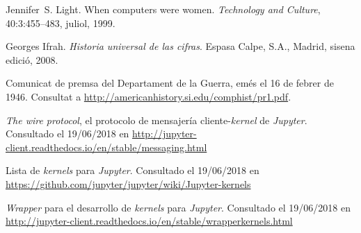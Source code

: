 \documentclass[11pt,spanish,listoffigures,listoftables]{tfgetsinf}
\begin{document}


\printglossary[title=Glosario]





\begin{thebibliography}{10}
   Jennifer~S. Light.
   \newblock When computers were women.
   \newblock \textit{Technology and Culture}, 40:3:455--483, juliol, 1999.

   Georges Ifrah.
   \newblock \textit{Historia universal de las cifras}.
   \newblock Espasa Calpe, S.A., Madrid, sisena edició, 2008.

   Comunicat de premsa del Departament de la Guerra, 
   emés el 16 de febrer de 1946. 
   \newblock Consultat a 
   \url{http://americanhistory.si.edu/comphist/pr1.pdf}.

	\textit{The wire protocol}, el protocolo de mensajería 
    cliente-\textit{kernel} de \textit{Jupyter}.
    \newblock Consultado el 19/06/2018 en
	\url{http://jupyter-client.readthedocs.io/en/stable/messaging.html}

	Lista de \textit{kernels} para \textit{Jupyter}.
    \newblock Consultado el 19/06/2018 en
	\url{https://github.com/jupyter/jupyter/wiki/Jupyter-kernels}

	\textit{Wrapper} para el desarrollo de \textit{kernels} para \textit{Jupyter}.
    \newblock Consultado el 19/06/2018 en
	\url{http://jupyter-client.readthedocs.io/en/stable/wrapperkernels.html}

\end{thebibliography}
\cleardoublepage
\end{document}
